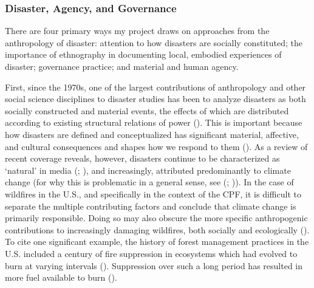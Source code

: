 \documentclass[
]{article}
\begin{document}
\subsubsection{Disaster, Agency, and Governance}\label{disaster-agency-and-governance}

There are four primary ways my project draws on approaches from the anthropology of disaster: attention to how disasters are socially constituted; the importance of ethnography in documenting local, embodied experiences of disaster; governance practice; and material and human agency.

First, since the 1970s, one of the largest contributions of anthropology and other social science disciplines to disaster studies has been to analyze disasters as both socially constructed and material events, the effects of which are distributed according to existing structural relations of power (). This is important because how disasters are defined and conceptualized has significant material, affective, and cultural consequences and shapes how we respond to them (). As a review of recent coverage reveals, however, disasters continue to be characterized as `natural' in media (; ), and increasingly, attributed predominantly to climate change (for why this is problematic in a general sense, see (; )). In the case of wildfires in the U.S., and specifically in the context of the CPF, it is difficult to separate the multiple contributing factors and conclude that climate change is primarily responsible. Doing so may also obscure the more specific anthropogenic contributions to increasingly damaging wildfires, both socially and ecologically (). To cite one significant example, the history of forest management practices in the U.S. included a century of fire suppression in ecosystems which had evolved to burn at varying intervals (). Suppression over such a long period has resulted in more fuel available to burn ().
\end{document}
